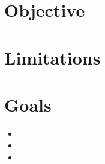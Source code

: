 




\section{}

\section{Objective}

\section{Limitations}

\section{Goals}

\begin{itemize}
	\item
	\item
	\item
\end{itemize}

